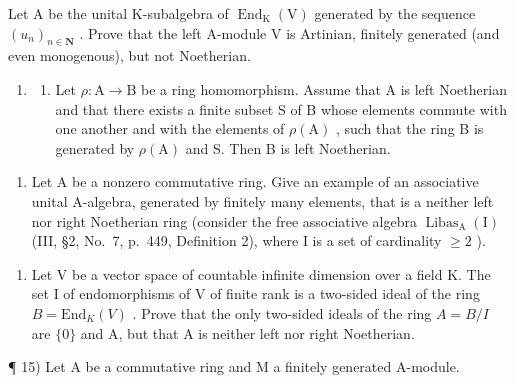 Let \(\mathrm{A}\) be the unital K-subalgebra of \(\operatorname{End}_{\mathrm{K}}(\mathrm{V})\) generated by the sequence \((u_n)_{n \in \mathbf{N}}\) . Prove that the left A-module \(\mathrm{V}\) is Artinian, finitely generated (and even monogenous), but not Noetherian.

\begin{enumerate}
\def\labelenumi{\arabic{enumi})}
\setcounter{enumi}{12}
\tightlist
\item
  \begin{enumerate}
  \def\labelenumii{\alph{enumii})}
  \tightlist
  \item
    Let \(\rho: \mathrm{A} \to \mathrm{B}\) be a ring homomorphism. Assume that A is left Noetherian and that there exists a finite subset S of B whose elements commute with one another and with the elements of \(\rho(\mathrm{A})\) , such that the ring B is generated by \(\rho(\mathrm{A})\) and S. Then B is left Noetherian.
  \end{enumerate}
\end{enumerate}

\begin{enumerate}
\def\labelenumi{\alph{enumi})}
\setcounter{enumi}{1}
\tightlist
\item
  Let A be a nonzero commutative ring. Give an example of an associative unital A-algebra, generated by finitely many elements, that is a neither left nor right Noetherian ring (consider the free associative algebra \(\operatorname{Libas}_{\mathrm{A}}(\mathrm{I})\) (III, §2, No.~7, p.~449, Definition 2), where I is a set of cardinality \(\geqslant 2\) ).
\end{enumerate}

\begin{enumerate}
\def\labelenumi{\arabic{enumi})}
\setcounter{enumi}{13}
\tightlist
\item
  Let V be a vector space of countable infinite dimension over a field K. The set I of endomorphisms of V of finite rank is a two-sided ideal of the ring \(B = \text{End}_{K}(V)\) . Prove that the only two-sided ideals of the ring \(A = B/I\) are \(\{0\}\) and A, but that A is neither left nor right Noetherian.
\end{enumerate}

¶ 15) Let A be a commutative ring and M a finitely generated A-module.

